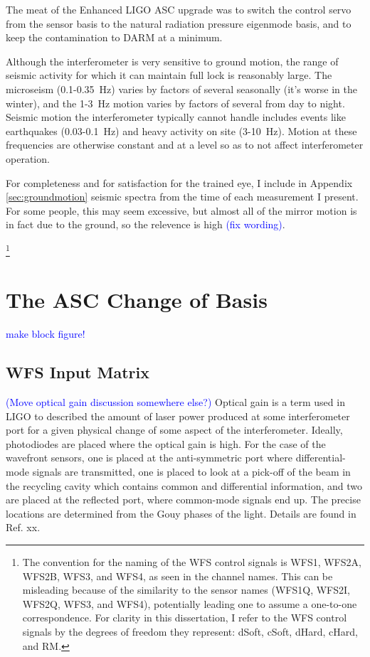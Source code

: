 The meat of the Enhanced LIGO ASC upgrade was to switch the control servo
from the sensor basis to the natural radiation pressure eigenmode
basis, and to keep the contamination to DARM at a minimum. 


Although the interferometer is very sensitive to ground motion, the
range of seismic activity for which it can maintain full lock is
reasonably large. The microseism (0.1-0.35~Hz) varies by factors of
several seasonally (it's worse in the winter), and the 1-3~Hz motion
varies by factors of several from day to night. Seismic motion the
interferometer typically cannot handle includes events like
earthquakes (0.03-0.1~Hz) and heavy activity on site (3-10~Hz). Motion
at these frequencies are otherwise constant and at a level so as to
not affect interferometer operation. 

For completeness and for satisfaction for the trained eye, I include
in Appendix \ref{sec:groundmotion} seismic spectra from the time of
each measurement I present. For some people, this may seem excessive,
but almost all of the mirror motion is in fact due to the ground, so
the relevence is high \textcolor{blue}{(fix wording)}. 


\footnote{The convention for the naming of the WFS control signals is
  WFS1, WFS2A, WFS2B, WFS3, and WFS4, as seen in the channel
  names. This can be misleading because of the similarity to the
  sensor names (WFS1Q, WFS2I, WFS2Q, WFS3, and WFS4), potentially
  leading one to assume a one-to-one correspondence. For clarity in
  this dissertation, I refer to the WFS control signals by the degrees of
  freedom they represent: dSoft, cSoft, dHard, cHard, and RM.}







\section{The ASC Change of Basis}
\textcolor{blue}{make block figure!}



\subsection{WFS Input Matrix}
\textcolor{blue}{(Move optical gain discussion somewhere else?)}
Optical gain is a term used in LIGO to described the amount of laser
power produced at some interferometer port for a given physical change
of some aspect of the interferometer. Ideally, photodiodes are placed
where the optical gain is high. For the case of the wavefront sensors,
one is placed at the anti-symmetric port where differential-mode
signals are transmitted, one is placed to look at a pick-off of the
beam in the recycling cavity which contains common and differential
information, and two are placed at the reflected port, where
common-mode signals end up. The precise locations are determined from
the Gouy phases of the light. Details are found in Ref. xx.

